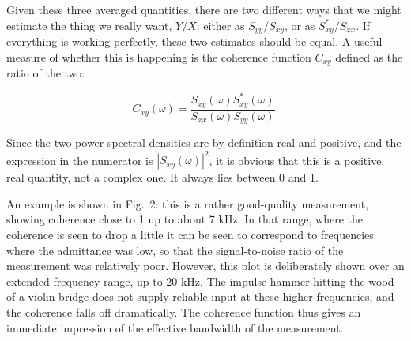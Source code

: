   Given these three averaged quantities, there are two different ways that we 
  might estimate the thing we really want, $Y/X$: either as $S_{yy}/S_{xy}$, or 
  as $S^*_{xy}/S_{xx}$. If everything is working perfectly, these two estimates 
  should be equal. A useful measure of whether this is happening is the 
  coherence function $C_{xy}$ defined as the ratio of the two: 

  $$C_{xy}(\omega)=\dfrac{S_{xy}(\omega)S^*_{xy}(\omega)}{S_{xx}(\omega) 
  S_{yy}(\omega)} .\tag{4}$$ 

  Since the two power spectral densities are by definition real and positive, 
  and the expression in the numerator is $|S_{xy}(\omega)|^2$, it is obvious 
  that this is a positive, real quantity, not a complex one. It always lies 
  between 0 and 1. 

  An example is shown in Fig.\ 2: this is a rather good-quality measurement, 
  showing coherence close to 1 up to about 7 kHz. In that range, where the 
  coherence is seen to drop a little it can be seen to correspond to 
  frequencies where the admittance was low, so that the signal-to-noise ratio 
  of the measurement was relatively poor. However, this plot is deliberately 
  shown over an extended frequency range, up to 20 kHz. The impulse hammer 
  hitting the wood of a violin bridge does not supply reliable input at these 
  higher frequencies, and the coherence falls off dramatically. The coherence 
  function thus gives an immediate impression of the effective bandwidth of the 
  measurement. 

